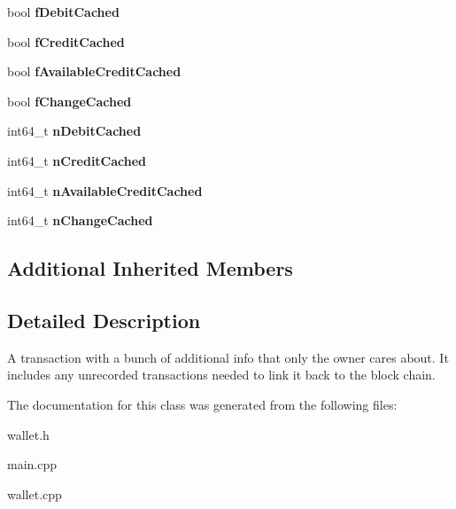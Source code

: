 \begin{DoxyCompactItemize}
\mbox{\label{class_c_wallet_tx_ad2dca68c99f2e677e5999c9872a269da}} 
bool {\bfseries f\+Debit\+Cached}
\item 
\mbox{\label{class_c_wallet_tx_ad896ca73e00251f900185a1114c3c506}} 
bool {\bfseries f\+Credit\+Cached}
\item 
\mbox{\label{class_c_wallet_tx_ac059d14ddf84de69430c57a12573b412}} 
bool {\bfseries f\+Available\+Credit\+Cached}
\item 
\mbox{\label{class_c_wallet_tx_ab436a962e5e32d392928bc68af968bf1}} 
bool {\bfseries f\+Change\+Cached}
\item 
\mbox{\label{class_c_wallet_tx_a05bfd7dcbdd121e78f9239019854a1ef}} 
int64\+\_\+t {\bfseries n\+Debit\+Cached}
\item 
\mbox{\label{class_c_wallet_tx_a8b9aee8e35ded6fb22a489ba32f6e343}} 
int64\+\_\+t {\bfseries n\+Credit\+Cached}
\item 
\mbox{\label{class_c_wallet_tx_af019bfc4560dfc4301936469e48d569c}} 
int64\+\_\+t {\bfseries n\+Available\+Credit\+Cached}
\item 
\mbox{\label{class_c_wallet_tx_a3ed8b65200ccb442dabbea82d12d7473}} 
int64\+\_\+t {\bfseries n\+Change\+Cached}
\end{DoxyCompactItemize}
\subsection*{Additional Inherited Members}


\subsection{Detailed Description}
A transaction with a bunch of additional info that only the owner cares about. It includes any unrecorded transactions needed to link it back to the block chain. 

The documentation for this class was generated from the following files\+:\begin{DoxyCompactItemize}
\item 
wallet.\+h\item 
main.\+cpp\item 
wallet.\+cpp\end{DoxyCompactItemize}
